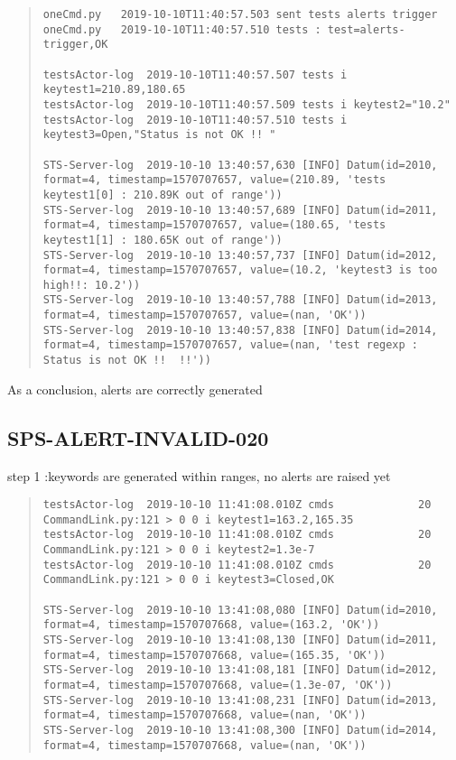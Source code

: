 \begin{quote}
\begin{tiny}
\begin{verbatim}
oneCmd.py   2019-10-10T11:40:57.503 sent tests alerts trigger
oneCmd.py   2019-10-10T11:40:57.510 tests : test=alerts-trigger,OK

testsActor-log  2019-10-10T11:40:57.507 tests i keytest1=210.89,180.65
testsActor-log  2019-10-10T11:40:57.509 tests i keytest2="10.2"
testsActor-log  2019-10-10T11:40:57.510 tests i keytest3=Open,"Status is not OK !! "

STS-Server-log  2019-10-10 13:40:57,630 [INFO] Datum(id=2010, format=4, timestamp=1570707657, value=(210.89, 'tests keytest1[0] : 210.89K out of range'))
STS-Server-log  2019-10-10 13:40:57,689 [INFO] Datum(id=2011, format=4, timestamp=1570707657, value=(180.65, 'tests keytest1[1] : 180.65K out of range'))
STS-Server-log  2019-10-10 13:40:57,737 [INFO] Datum(id=2012, format=4, timestamp=1570707657, value=(10.2, 'keytest3 is too high!!: 10.2'))
STS-Server-log  2019-10-10 13:40:57,788 [INFO] Datum(id=2013, format=4, timestamp=1570707657, value=(nan, 'OK'))
STS-Server-log  2019-10-10 13:40:57,838 [INFO] Datum(id=2014, format=4, timestamp=1570707657, value=(nan, 'test regexp : Status is not OK !!  !!'))
\end{verbatim}
\end{tiny}
\end{quote}

\noindent As a conclusion, alerts are correctly generated


\subsection{SPS-ALERT-INVALID-020}
\label{sec:tc-020}

step 1 :keywords are generated within ranges, no alerts are raised yet

\begin{quote}
\begin{tiny}
\begin{verbatim}
testsActor-log  2019-10-10 11:41:08.010Z cmds             20 CommandLink.py:121 > 0 0 i keytest1=163.2,165.35
testsActor-log  2019-10-10 11:41:08.010Z cmds             20 CommandLink.py:121 > 0 0 i keytest2=1.3e-7
testsActor-log  2019-10-10 11:41:08.010Z cmds             20 CommandLink.py:121 > 0 0 i keytest3=Closed,OK

STS-Server-log  2019-10-10 13:41:08,080 [INFO] Datum(id=2010, format=4, timestamp=1570707668, value=(163.2, 'OK'))
STS-Server-log  2019-10-10 13:41:08,130 [INFO] Datum(id=2011, format=4, timestamp=1570707668, value=(165.35, 'OK'))
STS-Server-log  2019-10-10 13:41:08,181 [INFO] Datum(id=2012, format=4, timestamp=1570707668, value=(1.3e-07, 'OK'))
STS-Server-log  2019-10-10 13:41:08,231 [INFO] Datum(id=2013, format=4, timestamp=1570707668, value=(nan, 'OK'))
STS-Server-log  2019-10-10 13:41:08,300 [INFO] Datum(id=2014, format=4, timestamp=1570707668, value=(nan, 'OK'))
\end{verbatim}
\end{tiny}
\end{quote}

